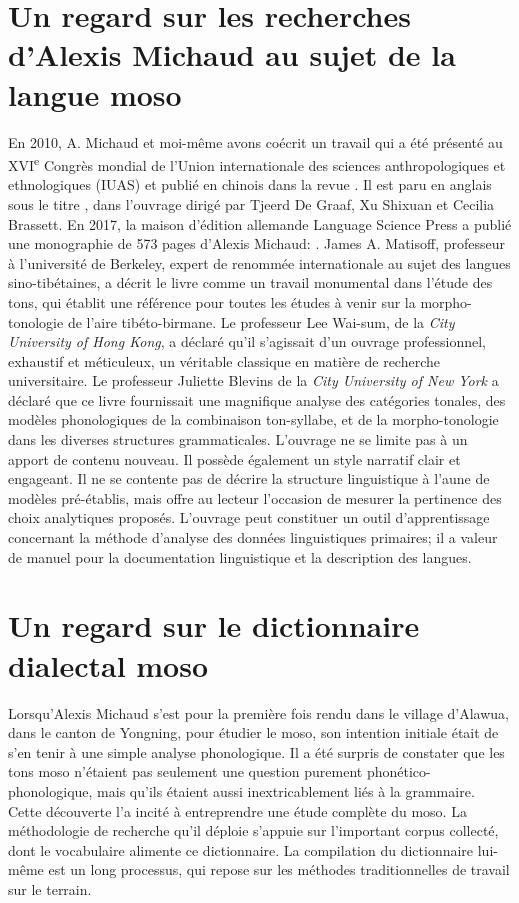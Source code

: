 \section*{Un regard sur les recherches d’Alexis Michaud au sujet de la langue moso}

En 2010, A. Michaud et moi-même avons coécrit un travail qui a été présenté au XVI\textsuperscript{e} Congrès mondial de l'Union internationale des sciences anthropologiques et ethnologiques (IUAS) et publié en chinois dans la revue . Il est paru en anglais sous le titre , dans l’ouvrage \emph{} dirigé par Tjeerd De Graaf, Xu Shixuan et Cecilia Brassett. En 2017, la maison d'édition allemande Language Science Press a publié une monographie de 573 pages d’Alexis Michaud: \emph{}. James A. Matisoff, professeur à l'université de Berkeley, expert de renommée internationale au sujet des langues sino-tibétaines, a décrit le livre comme un travail monumental dans l'étude des tons, qui établit une référence pour toutes les études à venir sur la morpho-tonologie de l’aire tibéto-birmane. Le professeur Lee Wai-sum, de la \emph{City University of Hong Kong}, a déclaré qu'il s'agissait d'un ouvrage professionnel, exhaustif et méticuleux, un véritable classique en matière de recherche universitaire. Le professeur Juliette Blevins de la \emph{City University of New York} a déclaré que ce livre fournissait une magnifique analyse des catégories tonales, des modèles phonologiques de la combinaison ton-syllabe, et de la morpho-tonologie dans les diverses structures grammaticales. L’ouvrage ne se limite pas à un apport de contenu nouveau. Il possède également un style narratif clair et engageant. Il ne se contente pas de décrire la structure linguistique à l’aune de modèles pré-établis, mais offre au lecteur l’occasion de mesurer la pertinence des choix analytiques proposés. L'ouvrage peut constituer un outil d'apprentissage concernant la méthode d’analyse des données linguistiques primaires; il a valeur de manuel pour la documentation linguistique et la description des langues.

\section*{Un regard sur le dictionnaire dialectal moso}

Lorsqu’Alexis Michaud s'est pour la première fois rendu dans le village d'Alawua, dans le canton de Yongning, pour étudier le moso, son intention initiale était de s’en tenir à une simple analyse phonologique. Il a été surpris de constater que les tons moso n'étaient pas seulement une question purement phonético-phonologique, mais qu'ils étaient aussi inextricablement liés à la grammaire. Cette découverte l'a incité à entreprendre une étude complète du moso. La méthodologie de recherche qu’il déploie s’appuie sur l’important corpus collecté, dont le vocabulaire alimente ce dictionnaire. La compilation du dictionnaire lui-même est un long processus, qui repose sur les méthodes traditionnelles de travail sur le terrain.

